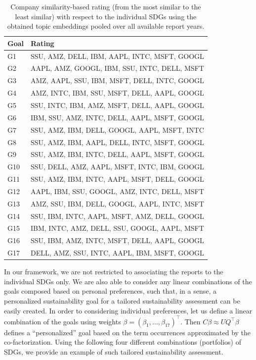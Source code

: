 \documentclass[
]{article}
\begin{document}
\begin{table}[H]
\centering
\caption{\label{tab:tab02}Company similarity-based rating (from the most similar to the least similar) with respect to the individual SDGs using the obtained topic embeddings pooled over all available report years.}
\centering
\begin{tabular}[t]{l|l}
\hline
Goal & Rating\\
\hline
G1 & SSU, AMZ, DELL, IBM, AAPL, INTC, MSFT, GOOGL\\
\hline
G2 & AAPL, AMZ, GOOGL, IBM, SSU, INTC, DELL, MSFT\\
\hline
G3 & AMZ, AAPL, SSU, IBM, MSFT, DELL, INTC, GOOGL\\
\hline
G4 & AMZ, INTC, IBM, SSU, MSFT, DELL, AAPL, GOOGL\\
\hline
G5 & SSU, INTC, IBM, AMZ, MSFT, DELL, AAPL, GOOGL\\
\hline
G6 & IBM, SSU, AMZ, INTC, DELL, AAPL, MSFT, GOOGL\\
\hline
G7 & SSU, AMZ, IBM, DELL, GOOGL, AAPL, MSFT, INTC\\
\hline
G8 & SSU, AMZ, IBM, AAPL, DELL, INTC, MSFT, GOOGL\\
\hline
G9 & SSU, AMZ, IBM, INTC, DELL, AAPL, MSFT, GOOGL\\
\hline
G10 & SSU, DELL, AMZ, AAPL, MSFT, INTC, IBM, GOOGL\\
\hline
G11 & SSU, AMZ, IBM, INTC, AAPL, MSFT, DELL, GOOGL\\
\hline
G12 & AAPL, IBM, SSU, GOOGL, AMZ, INTC, DELL, MSFT\\
\hline
G13 & AMZ, SSU, IBM, DELL, GOOGL, AAPL, INTC, MSFT\\
\hline
G14 & SSU, IBM, INTC, AAPL, MSFT, AMZ, DELL, GOOGL\\
\hline
G15 & IBM, INTC, AMZ, DELL, SSU, GOOGL, AAPL, MSFT\\
\hline
G16 & SSU, IBM, AMZ, INTC, MSFT, DELL, AAPL, GOOGL\\
\hline
G17 & DELL, AMZ, SSU, INTC, AAPL, IBM, MSFT, GOOGL\\
\hline
\end{tabular}
\end{table}

In our framework, we are not restricted to associating the reports to the individual SDGs only. We are also able to consider any linear combinations of the goals composed based on personal preferences, such that, in a sense, a personalized sustainability goal for a tailored sustainability assessment can be easily created. In order to considering individual preferences, let us define a linear combination of the goals using weights \(\beta=(\beta_1,\ldots,\beta_{17})^\top\). Then \(C\beta\approx UQ^\top\beta\) defines a ``personalized'' goal based on the term occurrences approximated by the co-factorization. Using the following four different combinations (portfolios) of SDGs, we provide an example of such tailored sustainability assessment.
\end{document}
